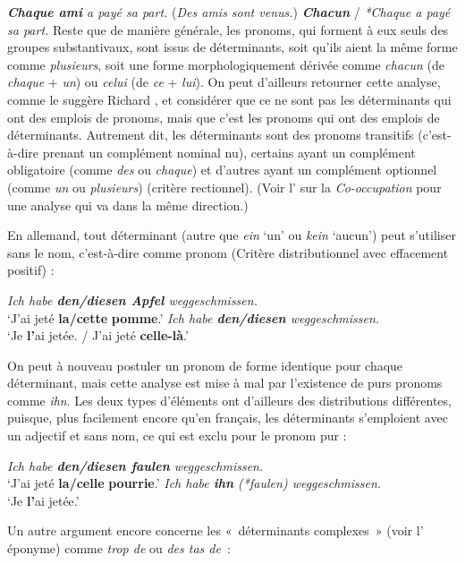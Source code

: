 \ea \textit{\textbf{{Chaque ami}}  {a payé sa part.}}
\ex (\textit{{Des amis sont venus.}}) \textit{\textbf{{Chacun} }}{/}  \textit{{*Chaque a payé sa part.}}
\z
Reste que de manière générale, les pronoms, qui forment à eux seuls des groupes substantivaux, sont issus de déterminants, soit qu’ils aient la même forme comme \textit{plusieurs}, soit une forme morphologiquement dérivée comme \textit{chacun} (de \textit{chaque} + \textit{un}) ou \textit{celui} (de \textit{ce} + \textit{lui}). On peut d’ailleurs retourner cette analyse, comme le suggère Richard \citet[192]{hudson2006language}, et considérer que ce ne sont pas les déterminants qui ont des emplois de pronoms, mais que c’est les pronoms qui ont des emplois de déterminants. Autrement dit, les déterminants sont des pronoms transitifs (c’est-à-dire prenant un complément nominal nu), certains ayant un complément obligatoire (comme \textit{des} ou \textit{chaque}) et d’autres ayant un complément optionnel (comme \textit{un} ou \textit{plusieurs}) (critère rectionnel). (Voir l’ sur la \textit{Co-occupation} pour une analyse qui va dans la même direction.)

En allemand, tout déterminant (autre que \textit{ein} ‘un’ ou \textit{kein} ‘aucun’) peut s’utiliser sans le nom, c’est-à-dire comme pronom (Critère distributionnel avec effacement positif) :

\ea \textit{{Ich habe} \textbf{{den/diesen}  {Apfel}}  {weggeschmissen.}}\\
\glt ‘J’ai jeté \textbf{la/cette} \textbf{pomme}.’
\ex \textit{{Ich habe} \textbf{{den/diesen}}  {weggeschmissen.}}\\
\glt ‘Je \textbf{l’}ai jetée. / J’ai jeté \textbf{celle-là}.’
\z

On peut à nouveau postuler un pronom de forme identique pour chaque déterminant, mais cette analyse est mise à mal par l’existence de purs pronoms comme \textit{ihn}. Les deux types d’éléments ont d’ailleurs des distributions différentes, puisque, plus facilement encore qu’en français, les déterminants s’emploient avec un adjectif et sans nom, ce qui est exclu pour le pronom pur :

\ea \textit{{Ich habe} \textbf{{den/diesen}  {faulen} } {weggeschmissen.}}\\
\glt ‘J’ai jeté \textbf{la/celle} \textbf{pourrie}.’
\ex \textit{{Ich habe} \textbf{{ihn}} (*{faulen})  {weggeschmissen.}}\\
\glt ‘Je \textbf{l’}ai jetée.’
\z

Un autre argument encore concerne les «~déterminants complexes~» (voir l’ éponyme) comme \textit{trop de} ou \textit{des tas de~}:

